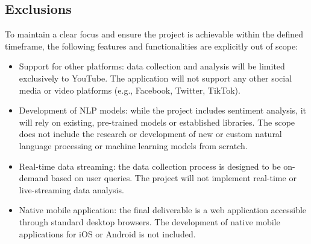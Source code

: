\subsection{Exclusions}

To maintain a clear focus and ensure the project is achievable within the defined timeframe, the following features and functionalities are explicitly out of scope:

\begin{itemize}
	\item Support for other platforms: data collection and analysis will be limited exclusively to YouTube. The application will not support any other social media or video platforms (e.g., Facebook, Twitter, TikTok).

	\item Development of NLP models: while the project includes sentiment analysis, it will rely on existing, pre-trained models or established libraries. The scope does not include the research or development of new or custom natural language processing or machine learning models from scratch.

	\item Real-time data streaming: the data collection process is designed to be on-demand based on user queries. The project will not implement real-time or live-streaming data analysis.

	\item Native mobile application: the final deliverable is a web application accessible through standard desktop browsers. The development of native mobile applications for iOS or Android is not included.
\end{itemize}
